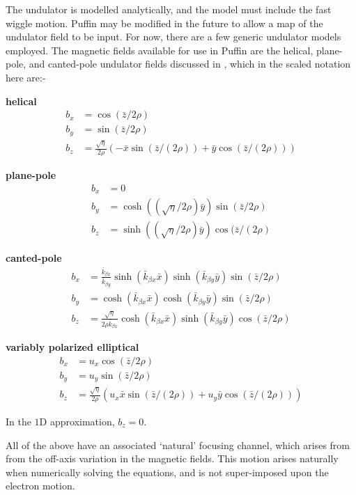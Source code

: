 \documentclass[12pt]{article}%
\begin{document}
The undulator is modelled analytically, and the model must include the fast wiggle motion. Puffin may be modified in the future to allow a map of the undulator field to be input. For now, there are a few generic undulator models employed. The magnetic fields available for use in Puffin are the helical, plane-pole, and canted-pole undulator fields discussed in \cite{scharlemann1}, which in the scaled notation here are:-

{\bf helical}
\begin{align}
b_x  & = \cos({\bar{z}/2\rho}) \\
b_y & =  \sin({\bar{z}/2\rho}) \\
b_z & = \frac{\sqrt{\eta}}{2\rho} (-\bar{x}\sin({\bar{z} / (2 \rho)}) + \bar{y}\cos({\bar{z} / (2 \rho)}))
\end{align}


{\bf plane-pole}
\begin{align}
b_x  & = 0 \\
b_y & =  \cosh((\sqrt{\eta}/{2\rho}) \bar{y}) \sin({\bar{z}/2\rho}) \\
b_z & =   \sinh((\sqrt{\eta}/{2\rho}) \bar{y}) \cos({\bar{z} / (2 \rho)}
\end{align}




{\bf canted-pole}
\begin{align}
b_x  & =  \frac{\bar{k}_{\beta x}}{\bar{k}_{\beta y}}  \sinh(\bar{k}_{\beta x} \bar{x} )  \sinh(   \bar{k}_{\beta y} \bar{y}    )   \sin({\bar{z}/2\rho}) \label{cp1} \\
b_y & =   \cosh(\bar{k}_{\beta x} \bar{x} )  \cosh(   \bar{k}_{\beta y} \bar{y}    )   \sin({\bar{z}/2\rho}) \label{cp2}\\
b_z & = \frac{\sqrt{\eta}}{2\rho \bar{k}_{\beta x}}     \cosh(\bar{k}_{\beta x} \bar{x} )    \sinh(   \bar{k}_{\beta y} \bar{y}    )    \cos({\bar{z}/2\rho}) \label{cp3}
\end{align}


{\bf variably polarized elliptical}
\begin{align}
b_x  & = u_x \cos({\bar{z}/2\rho}) \\
b_y & =  u_y \sin({\bar{z}/2\rho}) \\
b_z & = \frac{\sqrt{\eta}}{2\rho} (u_x \bar{x}\sin({\bar{z} / (2 \rho)}) + u_y \bar{y}\cos({\bar{z} / (2 \rho)}))
\end{align}


In the $1$D approximation, $b_z = 0$.

All of the above have an associated `natural' focusing channel, which arises from from the off-axis variation in the magnetic fields. This motion arises naturally when numerically solving the equations, and is not super-imposed upon the electron motion.
\end{document}

